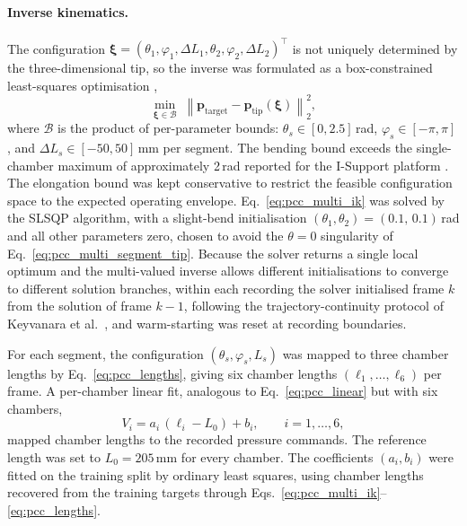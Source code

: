 \paragraph{Inverse kinematics.}
The configuration $\boldsymbol{\xi} = (\theta_1, \varphi_1, \Delta L_1, \theta_2, \varphi_2, \Delta L_2)^{\top}$ is not uniquely determined by the three-dimensional tip, so the inverse was formulated as a box-constrained least-squares optimisation \cite{keyvanara2023geometric},
\begin{equation}
  \min_{\boldsymbol{\xi} \in \mathcal{B}} \; \left\| \mathbf{p}_{\mathrm{target}} - \mathbf{p}_{\mathrm{tip}}(\boldsymbol{\xi}) \right\|^{2}_{2}, \label{eq:pcc_multi_ik}
\end{equation}
where $\mathcal{B}$ is the product of per-parameter bounds: $\theta_s \in [0, 2.5]$\,rad, $\varphi_s \in [-\pi, \pi]$, and $\Delta L_s \in [-50, 50]$\,mm per segment. The bending bound exceeds the single-chamber maximum of approximately 2\,rad reported for the I-Support platform \cite{manti2016soft}. The elongation bound was kept conservative to restrict the feasible configuration space to the expected operating envelope. Eq.~\eqref{eq:pcc_multi_ik} was solved by the SLSQP algorithm, with a slight-bend initialisation $(\theta_1, \theta_2) = (0.1,\, 0.1)$\,rad and all other parameters zero, chosen to avoid the $\theta = 0$ singularity of Eq.~\eqref{eq:pcc_multi_segment_tip}. Because the solver returns a single local optimum and the multi-valued inverse allows different initialisations to converge to different solution branches, within each recording the solver initialised frame $k$ from the solution of frame $k-1$, following the trajectory-continuity protocol of Keyvanara et al.\ \cite{keyvanara2023geometric}, and warm-starting was reset at recording boundaries.

For each segment, the configuration $(\theta_s, \varphi_s, L_s)$ was mapped to three chamber lengths by Eq.~\eqref{eq:pcc_lengths}, giving six chamber lengths $(\ell_1, \ldots, \ell_6)$ per frame. A per-chamber linear fit, analogous to Eq.~\eqref{eq:pcc_linear} but with six chambers,
\begin{equation}
  V_i = a_i \, (\ell_i - L_0) + b_i, \qquad i = 1, \ldots, 6, \label{eq:pcc_multi_linear}
\end{equation}
mapped chamber lengths to the recorded pressure commands. The reference length was set to $L_0 = 205$\,mm for every chamber. The coefficients $(a_i, b_i)$ were fitted on the training split by ordinary least squares, using chamber lengths recovered from the training targets through Eqs.~\eqref{eq:pcc_multi_ik}--\eqref{eq:pcc_lengths}.

